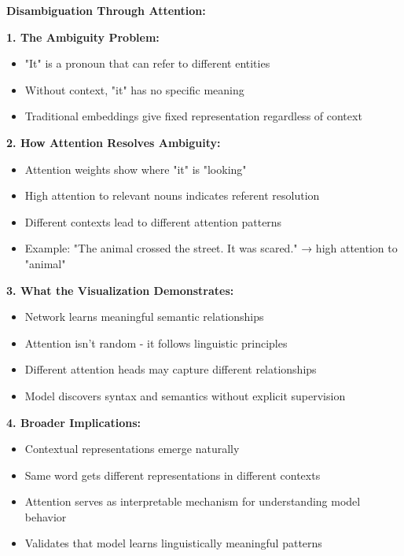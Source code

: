 \documentclass[12pt]{article}
\newcommand{\explanation}[1]{{\color{explanationcolor}#1}}
\begin{document}
\begin{enumerate}[(a)]
    \explanation{
    \textbf{Disambiguation Through Attention:}
    
    \textbf{1. The Ambiguity Problem:}
    \begin{itemize}
        \item "It" is a pronoun that can refer to different entities
        \item Without context, "it" has no specific meaning
        \item Traditional embeddings give fixed representation regardless of context
    \end{itemize}
    
    \textbf{2. How Attention Resolves Ambiguity:}
    \begin{itemize}
        \item Attention weights show where "it" is "looking"
        \item High attention to relevant nouns indicates referent resolution
        \item Different contexts lead to different attention patterns
        \item Example: "The animal crossed the street. It was scared." → high attention to "animal"
    \end{itemize}
    
    \textbf{3. What the Visualization Demonstrates:}
    \begin{itemize}
        \item Network learns meaningful semantic relationships
        \item Attention isn't random - it follows linguistic principles
        \item Different attention heads may capture different relationships
        \item Model discovers syntax and semantics without explicit supervision
    \end{itemize}
    
    \textbf{4. Broader Implications:}
    \begin{itemize}
        \item Contextual representations emerge naturally
        \item Same word gets different representations in different contexts
        \item Attention serves as interpretable mechanism for understanding model behavior
        \item Validates that model learns linguistically meaningful patterns
    \end{itemize}
    }
\end{enumerate}
\end{document}
